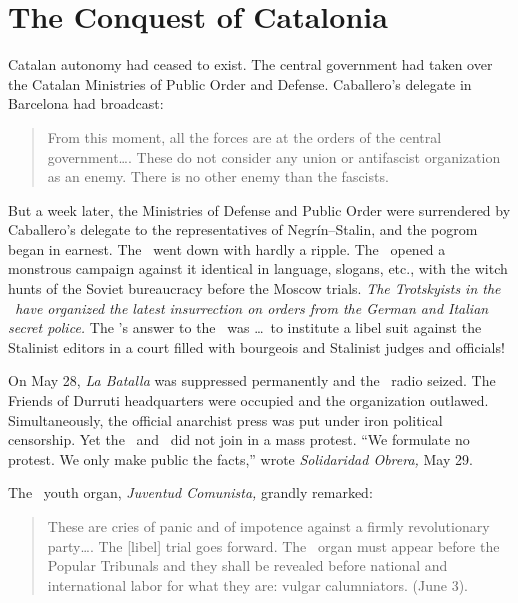 \chapter{The Conquest of Catalonia}

 Catalan autonomy had ceased to exist. The central government had taken over the Catalan Ministries of Public Order and Defense. Caballero’s{\indexLCaballero} delegate in Barcelona had broadcast:

\begin{quotation}
  From this moment, all the forces are at the orders of the central government\dots. These do not consider any union or antifascist organization as an enemy. There is no other enemy than the fascists.
\end{quotation}

But a week later, the Ministries of Defense and Public Order were surrendered by Caballero’s delegate to the representatives of Negr\'in--Stalin, and the pogrom began in earnest. The \POUM\indexPOUM\ went down with hardly a ripple. The \PSUC\ opened a monstrous campaign against it identical in language, slogans, etc., with the witch hunts of the Soviet bureaucracy before the Moscow trials. \emph{The Trotskyists in the \POUM\ have organized the latest insurrection on orders from the German and Italian secret police.} The \POUM’s answer to the \PSUC\ was \dots\ to institute a libel suit against the Stalinist editors in a court filled with bourgeois and Stalinist judges and officials!

On May 28, \emph{La Batalla} was suppressed permanently and the \POUM\ radio seized. The Friends of Durruti headquarters were occupied and the organization outlawed. Simultaneously, the official anarchist press was put under iron political censorship. Yet the \POUM\ and \CNT\ did not join in a mass protest. ``We formulate no protest. We only make public the facts,\kn\kn'' wrote \emph{Solidaridad Obrera,} May 29.

\medskip

The \POUM\ youth organ, \emph{Juventud Comunista,} grandly remarked:

\begin{quotation}
  These are cries of panic and of impotence against a firmly revolutionary party\dots. The [libel] trial goes forward. The \PSUC\ organ must appear before the Popular Tribunals and they shall be revealed before national and international labor for what they are: vulgar calumniators. (June 3).
\end{quotation}
  
